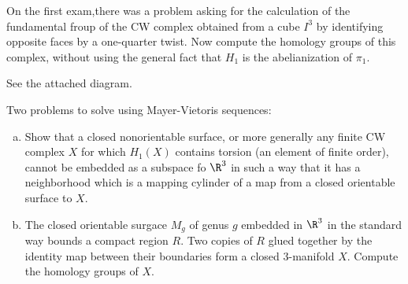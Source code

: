 \documentclass{article}
\begin{document}
\begin{problem}{4}{\parindent}
  On the first exam,there was a problem asking for the calculation of
  the fundamental froup of the CW complex obtained from a cube $I^3$
  by identifying opposite faces by a one-quarter twist. Now compute
  the homology groups of this complex, without using the general fact
  that $H_1$ is the abelianization of $\pi_1$.
\end{problem}
\begin{solution}{\parindent}
  See the attached diagram.
\end{solution}

\begin{problem}{5}{\parindent}
  Two problems to solve using Mayer-Vietoris sequences:
  \begin{enumerate}[(a)]
  \item Show that a closed nonorientable surface, or more generally
    any finite CW complex $X$ for which $H_1(X)$ contains torsion (an
    element of finite order), cannot be embedded as a subspace fo
    $\R^3$ in such a way that it has a neighborhood which is a mapping
    cylinder of a map from a closed orientable surface to $X$.
  \item The closed orientable surgace $M_g$ of genus $g$ embedded in
    $\R^3$ in the standard way bounds a compact region $R$. Two copies
    of $R$ glued together by the identity map between their boundaries
    form a closed 3-manifold $X$. Compute the homology groups of $X$.
  \end{enumerate}
\end{problem}
\end{document}
